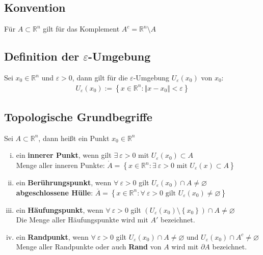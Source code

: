 \documentclass[11pt,a4paper]{book}
\newcommand {\Rn}	{\mathbb{R}^n}
\newcommand{\1}    	{\mathbbm{1}}
\begin{document}
\subsection{Konvention}
Für \(A \subset \Rn\) gilt für das Komplement \(A^c = \Rn \setminus A\)

\subsection{Definition der \(\varepsilon\)-Umgebung}
Sei \(x_0 \in \Rn\) und \(\varepsilon > 0\), dann gilt für die \(\varepsilon\)-Umgebung \(U_\varepsilon(x_0)\) von \(x_0\):
\begin{align*}
	U_\varepsilon(x_0) := \left\{ x \in \Rn : \Vert x - x_0 \Vert < \varepsilon \right\}
\end{align*}

\subsection{Topologische Grundbegriffe}
Sei \(A \subset \Rn\), dann heißt ein Punkt \(x_0 \in \Rn\)
\begin{enumerate}[(i)]
	\item ein \textbf{innerer Punkt}, wenn gilt \(\exists~ \varepsilon > 0\) mit \(U_\varepsilon(x_0) \subset A\) \\
	Menge aller inneren Punkte: \( \mathring{A} = \left\{ x \in \Rn : \exists~ \varepsilon > 0 \textrm{ mit } U_\varepsilon(x) \subset A \right\} \)
	\item ein \textbf{Berührungspunkt}, wenn \(\forall~ \varepsilon > 0\) gilt \(U_\varepsilon (x_0) \cap A \neq \varnothing \) \\
	\textbf{abgeschlossene Hülle}: \(\overline{A} = \left\{ x \in \Rn : \forall~ \varepsilon > 0 \textrm{ gilt } U_\varepsilon(x_0) \neq \varnothing \right\} \)
	\item ein \textbf{Häufungspunkt}, wenn \(\forall~ \varepsilon > 0\) gilt \( \left( U_\varepsilon(x_0) \setminus \left\{ x_0 \right\} \right) \cap A \neq \varnothing \) \\
	Die Menge aller Häufungspunkte wird mit \(A'\) bezeichnet.
	\item ein \textbf{Randpunkt}, wenn \(\forall~ \varepsilon > 0\) gilt \( U_\varepsilon(x_0) \cap A \neq \varnothing\) und \( U_\varepsilon(x_0) \cap A^c \neq \varnothing\) \\
	Menge aller Randpunkte oder auch \textbf{Rand} von \(A\) wird mit \(\partial A \) bezeichnet.
\end{enumerate}
\end{document}
